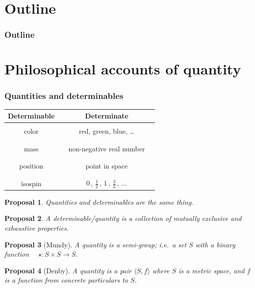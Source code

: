 \documentclass{beamer}
\newtheorem{prop}{Proposal}
\begin{document}

\section*{Outline}
\begin{frame}
\frametitle{Outline}
\tableofcontents
\end{frame}


\section{Philosophical accounts of quantity}
\begin{frame}
  \frametitle{Quantities and determinables}
\pause
\begin{tabular}{cc|cc}
  Determinable && Determinate \\ 
  \hline\hline & & & \\ color && red, green, blue, \dots \\ &&& \\
  \hline &&& \\ mass && non-negative real number \\ &&& \\
  \hline &&& \\ position &&  point in space  \\ &&& \\
  \hline &&& \\ isospin  &&  $0\,,\,\frac{1}{2}\,,\,1\,,\,\frac{3}{2}\,,\,\dots$ 
\end{tabular}


\end{frame}
\begin{frame}
  \begin{prop} Quantities and determinables are the same
    thing.  \end{prop} \pause
  \begin{prop} A determinable/quantity is a collection of mutually
    exclusive and exhaustive properties.  \end{prop} \pause
  \begin{prop}[Mundy]
    A quantity is a semi-group; i.e.\ a set $S$ with a binary function
    $\quad\star :S\times S\to S$.
\end{prop} \pause
\begin{prop}[Denby] 
  A quantity is a pair $\langle S,f\rangle$ where $S$ is a
  \emph{metric space}, and $f$ is a function from concrete particulars
  to $S$. \end{prop}
\end{frame}
\end{document}
